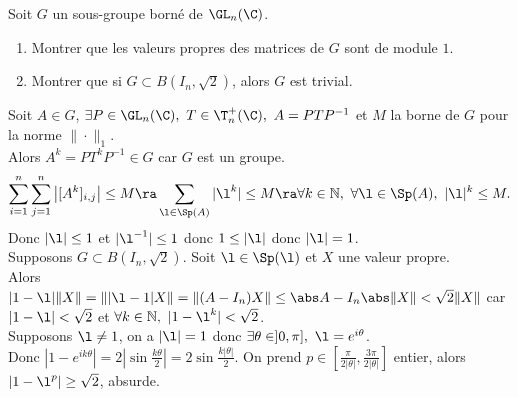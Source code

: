 \documentclass[11pt]{article}
\begin{document}
\begin{exercice}{}{}
    Soit $G$ un sous-groupe borné de $\GL_n(\C)$. 
    \begin{enumerate}
        \item Montrer que les valeurs propres des matrices de $G$ sont de module $1$.
        \item Montrer que si $G\subset B(I_n,\sqrt{2})$, alors $G$ est trivial.
    \end{enumerate}
    \tcblower
     Soit $A\in G$, $\exists P \in \GL_n(\C), ~ T\in\T_n^+(\C), ~ A=PTP^{-1}$ et $M$ la borne de $G$ pour la norme $\|\cdot\|_1$.\\
    Alors $A^k=PT^kP^{-1}\in G$ car $G$ est un groupe.
    \begin{equation*}
        \sum_{i=1}^n\sum_{j=1}^n\left|[A^k]_{i,j}\right|\leq M \ra \sum_{\l\in\Sp(A)}|\l^k|\leq M \ra \forall k \in \N, ~ \forall \l \in \Sp(A), ~ |\l|^k\leq M.
    \end{equation*}
    Donc $|\l|\leq1$ et $|\l^{-1}|\leq1$ donc $1\leq|\l|$ donc $|\l|=1$.\\
     Supposons $G\subset B(I_n,\sqrt{2})$. Soit $\l\in\Sp(\l)$ et $X$ une valeur propre.\\
    Alors $|1-\l|\|X\|=\||\l-1|X\|=\|(A-I_n)X\|\leq\abs A-I_n\abs \|X\|<\sqrt{2}\|X\|$ car $|1-\l|<\sqrt{2}$ et $\forall k \in \N, ~ |1-\l^k|<\sqrt{2}$.\\
    Supposons $\l\neq1$, on a $|\l|=1$ donc $\exists \theta\in]0,\pi], ~ \l=e^{i\theta}$.\\
    Donc $|1-e^{ik\theta}|=2|\sin\frac{k\theta}{2}|=2\sin\frac{k|\theta|}{2}$. On prend $p\in[\frac{\pi}{2|\theta|},\frac{3\pi}{2|\theta|}]$ entier, alors $|1-\l^p|\geq\sqrt{2}$, absurde.
\end{exercice}
\end{document}
